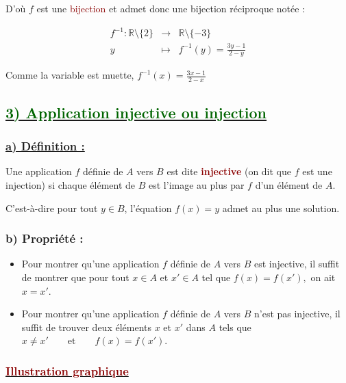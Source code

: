 \documentclass[12pt,a4paper]{article}
\begin{document}
D'où $f$ est une \textcolor{darkred}{bijection} et admet donc
une bijection réciproque notée :

\[ 
\begin{array}{rcl}
f^{-1}:\mathbb{R}\setminus\{2\} & \longrightarrow & \mathbb{R}\setminus\{-3\}\\
y & \longmapsto & f^{-1}(y)=\frac{3y-1}{2-y}
\end{array}
\]


Comme la variable est muette, $\boxed{
f^{-1}(x)=\frac{3x-1}{2-x}
}$

\subsection*{\underline{\textbf{\textcolor{darkgreen}{3) Application injective ou injection}}}}

\subsubsection*{\underline{\textbf{a) Définition :}}}

Une application $f$ définie de $A$ vers $B$ est dite
\textcolor{darkred}{\textbf{injective}} (on dit que $f$ est une injection)
si chaque élément de $B$ est l'image au plus par $f$ d'un élément de $A$.

C'est-à-dire pour tout $y\in B$, l'équation $f(x)=y$ admet au plus une solution.


\subsubsection*{\textbf{b) Propriété :}}

\begin{itemize}
    \item Pour montrer qu'une application $f$ définie de $A$ vers $B$ est injective,
    il suffit de montrer que pour tout $x\in A$ et $x'\in A$ tel que $ f(x)=f(x'),$
    on ait $x=x'.$

    \item Pour montrer qu'une application $f$ définie de $A$ vers $B$ n'est pas injective,
    il suffit de trouver deux éléments $x$ et $x'$ dans $A$ tels que $ x\neq x'
        \qquad\text{et}\qquad
        f(x)=f(x').$
\end{itemize}

\subsubsection*{\underline{\textbf{\textcolor{darkred}{Illustration graphique}}}}
\end{document}
